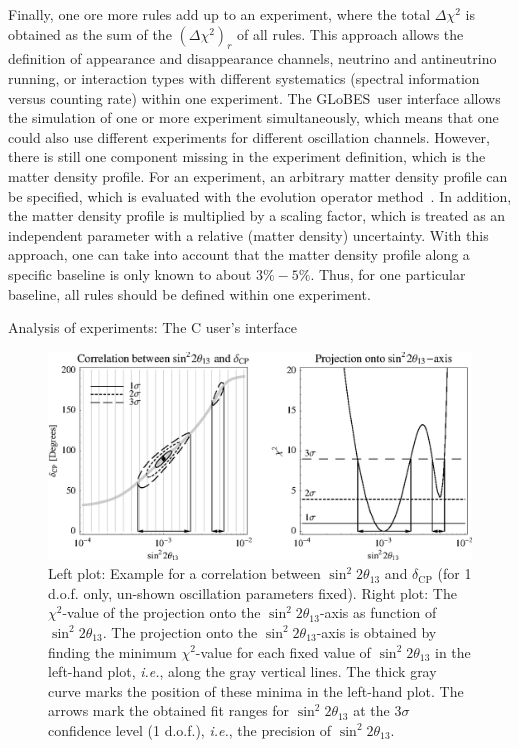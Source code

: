 \documentclass[12pt,a4paper]{article}
\makeatletter
\newcommand{\capdef}{}
\newcommand{\mycaption}[2][\capdef]{\renewcommand{\capdef}{#2}%
       \caption[#1]{{\footnotesize #2}}}
\renewcommand{\section}{\@startsection{section}{1}{0em}{-\baselineskip}%
{\baselineskip}{\normalfont\large\bfseries}}
\newcommand{\ie}{{\it i.e.}}
\newcommand{\deltacp}{\delta_{\mathrm{CP}}}
\newcommand{\stheta}{\sin^2 2 \theta_{13}}
\newcommand{\GLOBES}{{\sf GLoBES}}
\makeatother
\begin{document}
Finally, one ore more rules add up to an experiment, where the
total $\Delta \chi^2$ is obtained as the sum of the $(\Delta \chi^2)_r$
of all rules. This approach allows the definition of 
appearance and disappearance channels, neutrino and antineutrino running, 
or interaction types with different systematics (spectral information
versus counting rate) within one experiment. The \GLOBES\ user interface
allows the simulation of one or more experiment simultaneously, which
means that one could also use different experiments for different
oscillation channels. However, there is still one component missing
in the experiment definition, which is the matter density profile.
For an experiment, an arbitrary matter density profile can be specified, 
which is evaluated with the evolution operator method~\cite{Ohlsson:1999um}.
In addition, the matter density profile is multiplied by a scaling factor, 
which is treated as an independent parameter
with a relative (matter density) uncertainty. With this
approach, one can take into account that the matter density profile along a 
specific baseline is only known to about $3\%-5\%$. Thus, for one
particular baseline, all rules should be defined within one experiment.

\section{Analysis of experiments: The C user's interface}

\begin{figure}[t]
\begin{center}
\includegraphics[width=16cm]{projex}
\end{center}
\mycaption{\label{fig:projex} Left plot: Example for a  correlation between $\stheta$ and $\deltacp$ (for 1 d.o.f. only, un-shown oscillation
parameters fixed). Right plot: The $\chi^2$-value of the projection onto the $\stheta$-axis as function of $\stheta$. The projection onto the  $\stheta$-axis is obtained by finding the minimum $\chi^2$-value for each fixed value of $\stheta$ in the left-hand plot, \ie, along the gray vertical lines. The thick gray curve marks the position of these minima in the left-hand plot. The arrows mark the obtained fit ranges for $\stheta$ at the $3 \sigma$ confidence level (1 d.o.f.), \ie , the precision of $\stheta$.}
\end{figure}
\end{document}
